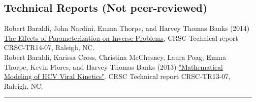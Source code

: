 \documentclass[10pt, a4paper]{article}
\newcommand{\years}[1]{\marginnote{\scriptsize #1}}
\begin{document}
\subsection*{Technical Reports (Not peer-reviewed)}
\noindent
\years{2014} Robert Baraldi, John Nardini, Emma Thorpe, and Harvey Thomas Banks (2014) \href{ http://www.ncsu.edu/crsc/reports/ftp/pdf/crsc-tr14-07.pdf}{The Effects of Parameterization on Inverse Problems}, CRSC Technical report CRSC-TR14-07, Raleigh, NC.\\
\noindent
\years{2013} Robert Baraldi, Karissa Cross, Christina McChesney, Laura Poag, Emma Thorpe, Kevin Flores, and Harvey Thomas Banks (2013) \href{http://www.ncsu.edu/crsc/reports/ftp/pdf/crsc-tr13-07.pdf}{"Mathematical Modeling of HCV Viral Kinetics"}. CRSC Technical report CRSC-TR13-07, Raleigh, NC.\\
\hrule


\end{document}
